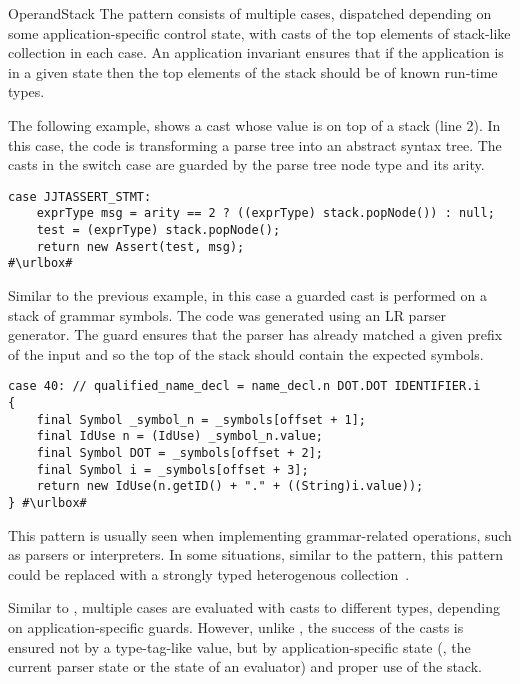 \begin{pattern}{OperandStack}
The \thisp{} pattern consists of multiple cases,
dispatched depending on some application-specific control state,
with casts of the top elements of stack-like collection in each case.
An application invariant ensures that if the application is in a given state
then the top elements of the stack should be of known run-time types.

\instances{}
The following example,
shows a cast whose value is on top of a stack (line 2).
In this case,
the code is transforming a parse tree into an abstract syntax tree.
The casts in the switch case are guarded by the parse tree node type and
its arity. 

\def\urlvar{http://bit.ly/fabioz_Pydev_2HF6nrF}
\begin{verbatim}
case JJTASSERT_STMT:
    exprType msg = arity == 2 ? ((exprType) stack.popNode()) : null;
    test = (exprType) stack.popNode();
    return new Assert(test, msg);
#\urlbox#
\end{verbatim}

Similar to the previous example,
in this case a guarded cast is performed on a stack of grammar symbols.
The code was generated using an LR parser generator.
The guard ensures that the parser has already matched a given prefix of the
input and so the top of the stack should contain the expected symbols.

\def\urlvar{http://bit.ly/Sable_soot_2MZLZ3m}
\begin{verbatim}
case 40: // qualified_name_decl = name_decl.n DOT.DOT IDENTIFIER.i
{
    final Symbol _symbol_n = _symbols[offset + 1];
    final IdUse n = (IdUse) _symbol_n.value;
    final Symbol DOT = _symbols[offset + 2];
    final Symbol i = _symbols[offset + 3];
    return new IdUse(n.getID() + "." + ((String)i.value));
} #\urlbox#
\end{verbatim}

\issues{}
This pattern is usually seen when implementing grammar-related operations,
such as parsers or interpreters.
In some situations, similar to the  pattern,
this pattern could be replaced with a strongly typed heterogenous collection~\citep{kiselyovStronglyTypedHeterogeneous2004}.

Similar to ,
multiple cases are evaluated with casts to different types,
depending on application-specific guards.
However, unlike , 
the success of the casts is ensured not by a type-tag-like value,
but by application-specific state
(\eg, the current parser state or the state of an evaluator)
and proper use of the stack.

\end{pattern}
